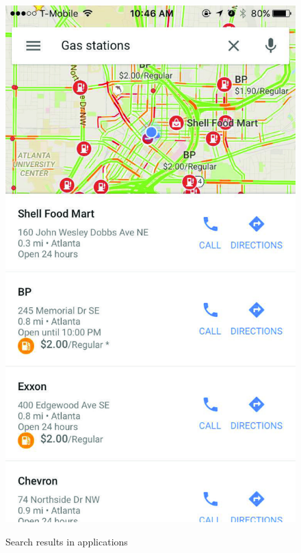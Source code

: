 \documentclass[a4paper,fleqn]{cas-dc}
\begin{document}
\begin{figure}
        {\includegraphics[scale=.9
        ]{figs/fig1-2.png}
            \label{fig:foo-2}
        }
    \caption{ Search results in applications }
    \label{fig:foo}
\end{figure}
\end{document}
